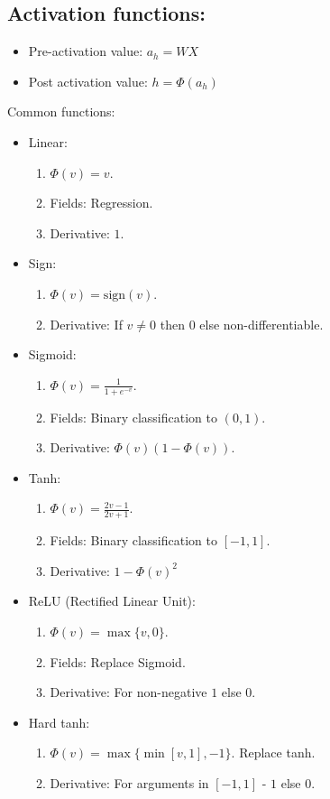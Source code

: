 \documentclass{article}
\begin{document}
\subsection{Activation functions: }
\begin{itemize}
\item Pre-activation value:  $a_h = WX$
\item Post activation value: $h = \Phi(a_h)$
\end{itemize}

Common functions:
\begin{itemize}
\item Linear: 
\begin{enumerate}
\item $\Phi(v) = v$. 
\item Fields: Regression. 
\item Derivative: $1$.
\end{enumerate}
\item Sign: 
\begin{enumerate}
\item $\Phi(v) = \text{sign}(v)$. 
\item Derivative: If $v\not=0$ then $0$ else non-differentiable.
\end{enumerate}
\item Sigmoid: 
\begin{enumerate}
\item $\Phi(v)  = \frac{1}{1+e^{-v}}$. 
\item Fields: Binary classification to $(0,1)$. 
\item Derivative: $\Phi(v)(1-\Phi(v))$.
\end{enumerate}

\item Tanh: 
\begin{enumerate}
\item $\Phi(v) = \frac{2v-1}{2v+1}$.
\item  Fields: Binary classification to $[-1,1]$. 
\item Derivative: $1-\Phi(v)^2$
\end{enumerate}

\item ReLU (Rectified Linear Unit): 
\begin{enumerate}
\item $\Phi(v) = \max\{v, 0\}$.
\item  Fields: Replace Sigmoid. 
\item Derivative: For non-negative $1$ else $0$.
\end{enumerate}

\item Hard tanh: 
\begin{enumerate}
\item $\Phi(v) = \max\{\min[v,1], -1\}$.  Replace tanh. 
\item Derivative:  For arguments in $[-1,1]$  - $1$ else  $0$.
\end{enumerate}

\end{itemize}
\end{document}
